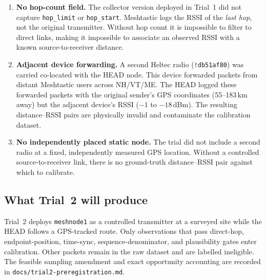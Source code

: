 \documentclass[11pt,letterpaper]{article}
\begin{document}
\begin{enumerate}[noitemsep]
  \item \textbf{No hop-count field.} The collector version deployed in Trial~1 did
    not capture \texttt{hop\_limit} or \texttt{hop\_start}. Meshtastic logs the RSSI
    of the \emph{last hop}, not the original transmitter. Without hop count it is
    impossible to filter to direct links, making it impossible to associate an
    observed RSSI with a known source-to-receiver distance.

  \item \textbf{Adjacent device forwarding.} A second Heltec radio
    (\texttt{!db51af80}) was carried co-located with the HEAD node. This device
    forwarded packets from distant Meshtastic users across NH/VT/ME. The HEAD logged
    these forwarded packets with the original sender's GPS coordinates (55--183\,km
    away) but the adjacent device's RSSI ($-1$ to $-18$\,dBm). The resulting
    distance--RSSI pairs are physically invalid and contaminate the calibration
    dataset.

  \item \textbf{No independently placed static node.} The trial did not include a
    second radio at a fixed, independently measured GPS location. Without a
    controlled source-to-receiver link, there is no ground-truth distance--RSSI
    pair against which to calibrate.
\end{enumerate}

\subsection*{What Trial~2 will produce}

Trial~2 deploys \texttt{meshnode1} as a controlled transmitter at a surveyed site
while the HEAD follows a GPS-tracked route. Only observations that pass direct-hop,
endpoint-position, time-sync, sequence-denominator, and plausibility gates enter
calibration. Other packets remain in the raw dataset and are labelled ineligible.
The feasible sampling amendment and exact opportunity accounting are recorded in
\texttt{docs/trial2-preregistration.md}.
\end{document}
